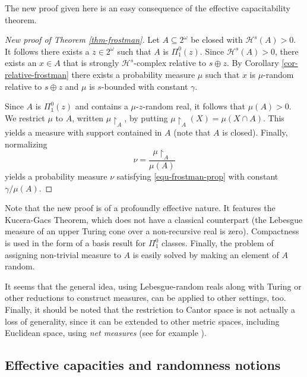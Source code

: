\documentclass[11pt,reqno]{article}
\theoremstyle{plain}
\theoremstyle{definition}
\theoremstyle{remark}
\numberwithin{equation}{section}
\newcommand{\Cant}{\ensuremath{2^{\omega}}}
\newcommand{\Rest}[1]{\ensuremath{\!\restriction_{#1}}}
\newcommand{\Hmeas}{\ensuremath{\mathcal{H}}}
\newcommand{\Hm}[1]{\ensuremath{\Hmeas^{#1}}}
\begin{document}
The new proof given here is an easy consequence of the effective capacitability theorem.

\begin{proof}[New proof of Theorem \ref{thm-frostman}]

Let $A \subseteq \Cant$ be closed with $\Hm{s}(A) > 0$. It follows there exists a $z \in \Cant$ such that $A$ is $\Pi^0_1(z)$. Since $\Hm{s}(A) > 0$, there exists an $x \in A$ that is strongly $\Hm{s}$-complex relative to $s\oplus z$. By Corollary \ref{cor-relative-frostman} there exists a probability measure $\mu$ such that $x$ is $\mu$-random relative to $s\oplus z$ and $\mu$ is $s$-bounded with constant $\gamma$.
	
	Since $A$ is $\Pi^0_1(z)$ and contains a $\mu$-$z$-random real, it follows that $\mu(A) > 0$. We restrict $\mu$ to $A$, written $\mu\Rest{A}$, by putting $\mu\Rest{A}(X) = \mu(X \cap A)$. This yields a measure with support contained in $A$ (note that $A$ is closed). Finally, normalizing
	\[
		\nu = \frac{\mu\Rest{A}}{\mu(A)}
	\]
	yields a probability measure $\nu$ satisfying \eqref{equ-frostman-prop} with constant $\gamma/\mu(A)$.  
 \end{proof}

Note that the new proof is of a profoundly effective nature. It features the Kucera-Gacs Theorem, which does not have a classical counterpart (the Lebesgue measure of an upper Turing cone over a non-recursive real is zero). Compactness is used in the form of a basis result for $\Pi^0_1$ classes. Finally, the problem of assigning non-trivial measure to $A$ is easily solved by making an element of $A$ random.

It seems that the general idea, using Lebesgue-random reals along with Turing or other reductions to construct measures, can be applied to other settings, too. Finally, it should be noted that the restriction to Cantor space is not actually a loss of generality, since it can be extended to other metric spaces, including Euclidean space, using \emph{net measures} (see for example \citep{rogers:1970}).





% 
% 
\subsection{Effective capacities and randomness notions} \label{ssec-cap-hrand-notions}
\end{document}
